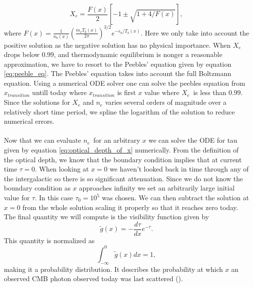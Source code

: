 \documentclass[onecolumn]{aastex62}
\begin{document}
\begin{equation}
    X_e = \frac{F(x)}{2}\left[-1\pm\sqrt{1+4/F(x)}\right],
\end{equation}
where $F(x)=\frac{1}{n_b(x)} \left(\frac{m_eT_b(x)}{2\pi}\right)^{3/2} e^{-\epsilon_0/T_b(x)}$. Here we only take into account the positive solution as the negative solution has no physical importance. When $X_e$ drops below $0.99$, and thermodynamic equilibrium is nonger a reasonable approximation, we have to resort to the Peebles' equation given by equation \ref{eq:peeble_eq}. The Peebles' equation takes into account the full Boltzmann equation. Using a numerical ODE solver one can solve the peebles equation from $x_{transition}$ untill today where $x_{transition}$ is first $x$ value where $X_e$ is less than $0.99$. Since the solutions for $X_e$ and $n_e$ varies several orders of magnitude over a relatively short time period, we spline the logarithm of the solution to reduce numerical errors.
\\\\\indent
Now that we can evaluate $n_e$ for an arbitrary $x$ we can solve the ODE for tau given by equation \ref{eq:optical_depth_of_x} numerically. From the definition of the optical depth, we know that the boundary condition implies that at current time $\tau=0$. When looking at $x=0$ we haven't looked back in time through any of the intergalactic so there is so significant attenuation. Since we do not know the boundary condition as $x$ approaches infinity we set an arbitrarily large initial value for $\tau$. In this case $\tau_0=10^5$ was chosen. We can then subtract the solution at $x=0$ from the whole solution scaling it properly so that it reaches zero today. The final quantity we will compute is the visibility function given by
\begin{equation}\label{eq:visibility}
    \widetilde{g}(x)=-\frac{d\tau}{dx}e^{-\tau}.
\end{equation}
This quantity is normalized as
\begin{equation}
    \int_{-\infty}^{0} \tilde{g}(x)dx = 1,
\end{equation}
making it a probability distribution. It describes the probability at which $x$ an observed CMB photon observed today was last scattered (\cite{callin2006calculate}).
\end{document}
